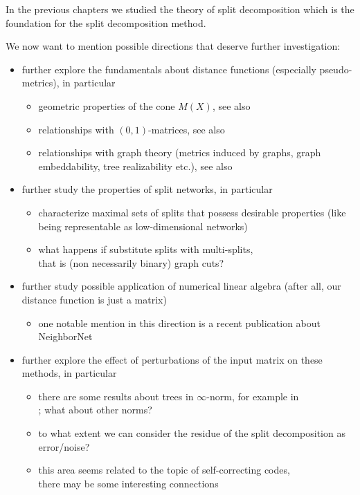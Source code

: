 \documentclass[./main.tex]{subfiles}
\begin{document}
\ifSubfilesClassLoaded{\mainmatter}{}

 \label{chap:concl}

In the previous chapters we studied the theory of split decomposition which is the foundation for the split decomposition method.\bigskip

We now want to mention possible directions that deserve further investigation:
\begin{itemize}
    \item further explore the fundamentals about distance functions (especially pseudo-metrics), in particular
    \begin{itemize}
        \item geometric properties of the cone $M(X)$, see also \cite{Avi80,Avi81,AD91}
        \item relationships with $(0,1)$-matrices, see also \cite{Ans80}
        \item relationships with graph theory (metrics induced by graphs, graph embeddability, tree realizability etc.), see also \cite{IS72,Mul82,SPZ82}
    \end{itemize}
    
    \item further study the properties of split networks, in particular
    \begin{itemize}
        \item characterize maximal sets of splits that possess desirable properties (like being representable as low-dimensional networks)
        \item what happens if substitute splits with multi-splits, \\
        that is (non necessarily binary) graph cuts?
    \end{itemize}

    \item further study possible application of numerical linear algebra (after all, our distance function is just a matrix)
    \begin{itemize}
        \item one notable mention in this direction is a recent publication about NeighborNet \cite{BH23}
    \end{itemize}

    \clearpage

    \item further explore the effect of perturbations of the input matrix on these methods, in particular
    \begin{itemize}
        \item there are some results about trees in $\infty$-norm, for example in \\
        \cites[§7.7]{SS03}[§10.2]{DHKMS12}; what about other norms?
        \item to what extent we can consider the residue of the split decomposition as error/noise?
        \item this area seems related to the topic of self-correcting codes, \\
        there may be some interesting connections
    \end{itemize}
    
\end{itemize}
\end{document}
